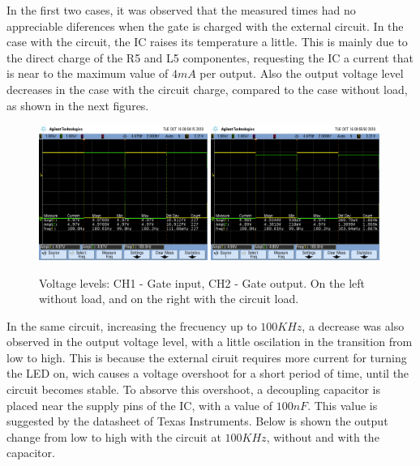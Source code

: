 In the first two cases, it was observed that the 
measured times had no appreciable diferences 
when the gate is charged with 
the external circuit. In the case with the circuit,
 the IC raises its temperature a little. This is
mainly due to the direct charge of the R5 and 
L5 componentes, requesting the IC a current
that is near to the maximum value of $4mA$ per 
output. \newpage
Also the output voltage level decreases
in the case with the circuit charge, compared to 
the case without load, as shown in the next figures. \\

\begin{figure}[H]
    \begin{centering}
    \includegraphics[width=0.49\textwidth]{data/ej4_gate1}
    \includegraphics[width=0.49\textwidth]{data/ej4_circuit}
    \par\end{centering}
    \caption{Voltage levels: CH1 - Gate input, CH2 - Gate output. On the left
    without load, and on the right with the circuit load.}
\end{figure}

In the same circuit, increasing the frecuency 
up to $100KHz$, a decrease was also observed 
in the output voltage level, with a little oscilation 
in the transition from low to high. This is because 
the external ciruit requires more current for 
turning the LED on, wich causes a voltage overshoot
for a short period of time, until the circuit becomes
stable. To absorve this overshoot, a decoupling 
capacitor is placed near the supply pins of the 
IC, with a value of $100nF$. This value is suggested 
by the datasheet of Texas Instruments. Below is shown 
the output change from low to high with the circuit 
at $100KHz$, without and with the capacitor.

